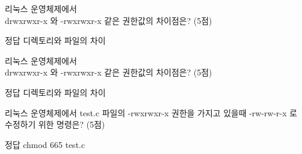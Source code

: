 \documentclass[A4paper,chapter,footnote,5pt]{oblivoir}
\begin{document}
\begin{Exlist}
\item 리눅스 운영체제에서 \\
drwxrwxr-x 와 -rwxrwxr-x 같은 권한값의 차이점은? (5점)
\begin{solution}\begin{explain}
\item[정답] 디렉토리와 파일의 차이
\end{explain}\end{solution}

\item 리눅스 운영체제에서 \\
drwxrwxr-x 와 -rwxrwxr-x 같은 권한값의 차이점은? (5점)
\begin{solution}\begin{explain}
\item[정답] 디렉토리와 파일의 차이
\end{explain}\end{solution}

\item 리눅스 운영체제에서 test.c 파일의 -rwxrwxr-x 권한을 가지고 있을때 -rw-rw-r-x 로 수정하기 위한 명령은? (5점)
\begin{solution}\begin{explain}
\item[정답] chmod 665 test.c
\end{explain}\end{solution}



\end{Exlist}
\end{document}
